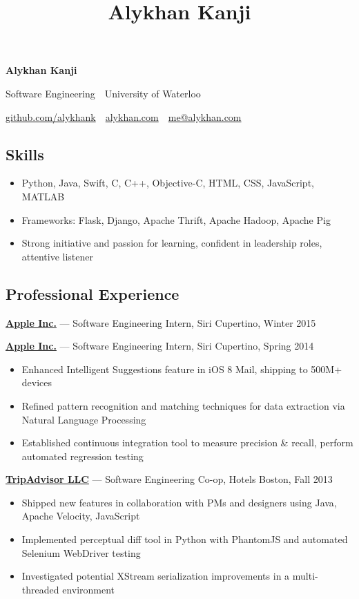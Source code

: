 \documentclass[pdftex,11pt,letterpaper]{article}
\title{Alykhan Kanji}
\begin{document}
\begin{center}
  {\Huge \textbf{Alykhan Kanji}}

  {\large
    Software Engineering\ \textperiodcentered \ University of Waterloo

    \href{https://github.com/alykhank}{github.com/alykhank}\ \textperiodcentered \ \href{http://alykhan.com}{alykhan.com}\ \textperiodcentered \ \href{mailto:me@alykhan.com}{me@alykhan.com}
  }
\end{center}

\subsection*{Skills}

\begin{itemize}[before=,after=]
  \item Python, Java, Swift, C, C++, Objective-C, HTML, CSS, JavaScript, MATLAB
  \item Frameworks: Flask, Django, Apache Thrift, Apache Hadoop, Apache Pig
  \item Strong initiative and passion for learning, confident in leadership roles, attentive listener
\end{itemize}

\subsection*{Professional Experience}

\href{http://apple.com}{\textbf{Apple Inc.}} --- Software Engineering Intern, Siri \hfill {\color{gray} Cupertino, Winter 2015}
\vspace{6mm}

\href{http://apple.com}{\textbf{Apple Inc.}} --- Software Engineering Intern, Siri \hfill {\color{gray} Cupertino, Spring 2014}
\begin{itemize}
  \item Enhanced Intelligent Suggestions feature in iOS 8 Mail, shipping to 500M+ devices
  \item Refined pattern recognition and matching techniques for data extraction via Natural Language Processing
  \item Established continuous integration tool to measure precision \& recall, perform automated regression testing
\end{itemize}

\href{http://tripadvisor.com}{\textbf{TripAdvisor LLC}} --- Software Engineering Co-op, Hotels \hfill {\color{gray} Boston, Fall 2013}
\begin{itemize}
  \item Shipped new features in collaboration with PMs and designers using Java, Apache Velocity, JavaScript
  \item Implemented perceptual diff tool in Python with PhantomJS and automated Selenium WebDriver testing
  \item Investigated potential XStream serialization improvements in a multi-threaded environment
\end{itemize}
\end{document}
